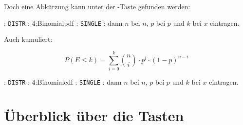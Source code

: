 Doch eine Abkürzung kann unter der -Taste gefunden werden:

: \texttt{DISTR} :  4:Binomialpdf :
\texttt{SINGLE} : dann $n$ bei $n$, $p$ bei $p$ und $k$ bei $x$ eintragen.

Auch kumuliert:

 $$P(E \le k) = \sum_{i=0}^{k}{n \choose i}\cdot{}p^i\cdot{}(1-p)^{n-i}$$

: \texttt{DISTR} :  4:Binomialcdf :
\texttt{SINGLE} : dann $n$ bei $n$, $p$ bei $p$ und $k$ bei $x$ eintragen.

     


\newpage


\section*{Überblick über die Tasten}

